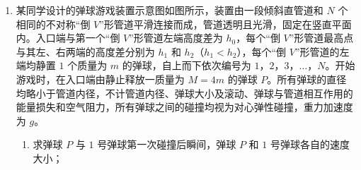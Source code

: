 \begin{enumerate}
\begin{enumerate}
\item
在 (1) 问操作后关闭气阀 $ K $，封闭体积为 $ V_{0} $ 的气体（视为理想气体），然后用水平拉力向右缓慢拉动活塞 $ a $，直到重物刚要开始向上运动，已知此过程中气体吸收的热量为 $ Q $，求该过程活塞 $ a $ 的位移大小及拉力对活塞 $ a $ 做的功；

\item
在 (2) 问操作后继续缓慢拉动活塞 $ a $，使重物上升高度 $ H $，此时活塞 $ b $ 未到达汽缸 $ B $ 的顶部，求该过程中水平拉力对活塞 $ a $ 做的功。
\end{enumerate}
\begin{figure}[htbp]
	\raggedleft
	
\end{figure}

\item
某同学设计的弹球游戏装置示意图如图所示，装置由一段倾斜直管道和 $ N $ 个相同的不对称“倒 $ V $”形管道平滑连接而成，管道透明且光滑，固定在竖直平面内。入口端与第一个“倒 $ V $”形管道左端高度差为 $ h_{0} $，每个“倒 $ V $”形管道最高点与其左、右两端的高度差分别为 $ h_{1} $ 和 $ h_{2} $（$h_{1} < h_{2}$），每个“倒 $ V $”形管道的左端均静置 $ 1 $ 个质量为 $ m $ 的弹球，自上而下依次编号为 $ 1 $，$ 2 $，$ 3 $，$ \ldots $，$ N $。开始游戏时，在入口端由静止释放一质量为 $ M =4 m $ 的弹球 $ P $。所有弹球的直径均略小于管道内径，不计管道内径、弹球大小及滚动、弹球与管道相互作用的能量损失和空气阻力，所有弹球之间的碰撞均视为对心弹性碰撞，重力加速度为 $ g $。
\begin{enumerate}
	\item 
求弹球 $ P $ 与 $ 1 $ 号弹球第一次碰撞后瞬间，弹球 $ P $ 和 $ 1 $ 号弹球各自的速度大小；


\end{enumerate}
\end{enumerate}
